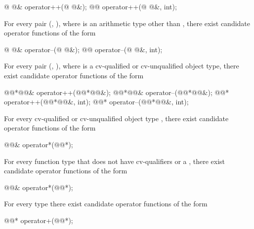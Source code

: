 \begin{codeblock}
@ @& operator++(@ @&);
@@ operator++(@ @&, int);
\end{codeblock}

\pnum
For every pair
(,
),
where
is an arithmetic type other than
,
there exist candidate operator functions of the form

\begin{codeblock}
@ @& operator--(@ @&);
@@ operator--(@ @&, int);
\end{codeblock}

\pnum
For every pair
(,
),
where
is a cv-qualified or cv-unqualified object type,
there exist candidate operator functions of the form

\begin{codeblock}
@@*@@& operator++(@@*@@&);
@@*@@& operator--(@@*@@&);
@@*    operator++(@@*@@&, int);
@@*    operator--(@@*@@&, int);
\end{codeblock}

\pnum
For every cv-qualified or cv-unqualified object type
,
there exist candidate operator functions of the form

\begin{codeblock}
@@&    operator*(@@*);
\end{codeblock}

\pnum
For every function type
 that does not have cv-qualifiers or a ,
there exist candidate operator functions of the form

\begin{codeblock}
@@&    operator*(@@*);
\end{codeblock}

\pnum
For every type  there exist candidate operator functions of the form

\begin{codeblock}
@@*    operator+(@@*);
\end{codeblock}

